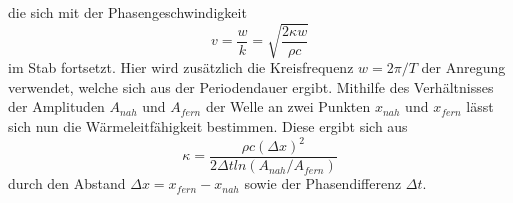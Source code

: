die sich mit der Phasengeschwindigkeit
\begin{equation}
v=\frac{w}{k}=\sqrt{\frac{2\kappa w}{\rho c}}
\end{equation}
im Stab fortsetzt. Hier wird zusätzlich die Kreisfrequenz $w=2\pi /T$ der Anregung verwendet, welche sich aus der Periodendauer ergibt. Mithilfe des Verhältnisses der Amplituden $A_{nah}$ und $A_{fern}$ der Welle an zwei Punkten $x_{nah}$ und $x_{fern}$ lässt sich nun die Wärmeleitfähigkeit bestimmen. Diese ergibt sich aus 
\begin{equation}
    \label{eq:sechs}
\kappa=\frac{\rho c (\Delta x)^2}{2 \Delta t ln(A_{nah}/A_{fern})}
\end{equation}
durch den Abstand $\Delta x=x_{fern}-x_{nah}$ sowie der Phasendifferenz $\Delta t$.
